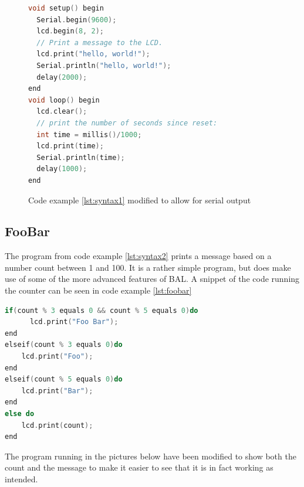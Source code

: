\begin{figure}[h!]
\begin{lstlisting}[caption=Hello World with serial output, language={C++},label=lst:serial]
void setup() begin
  Serial.begin(9600);
  lcd.begin(8, 2);
  // Print a message to the LCD.
  lcd.print("hello, world!");
  Serial.println("hello, world!");
  delay(2000);
end
void loop() begin
  lcd.clear();
  // print the number of seconds since reset:
  int time = millis()/1000; 
  lcd.print(time);
  Serial.println(time);
  delay(1000);
end
\end{lstlisting}
\caption{Code example \ref{lst:syntax1} modified to allow for serial output}
\end{figure}

\subsection*{FooBar}
The program from code example \ref{lst:syntax2} prints a message based on a number count between 1 and 100. It is a rather simple program, but does make use of some of the more advanced features of BAL. A snippet of the code running the counter can be seen in code example \ref{lst:foobar}
\begin{lstlisting}[caption=Hello World with serial output,firstnumber=26, language={C++},label=lst:foobar]
if(count % 3 equals 0 && count % 5 equals 0)do
      lcd.print("Foo Bar"); 
end
elseif(count % 3 equals 0)do
    lcd.print("Foo");
end
elseif(count % 5 equals 0)do
    lcd.print("Bar");
end
else do
    lcd.print(count);
end
\end{lstlisting}

The program running in the pictures below have been modified to show both the count and the message to make it easier to see that it is in fact working as intended.


